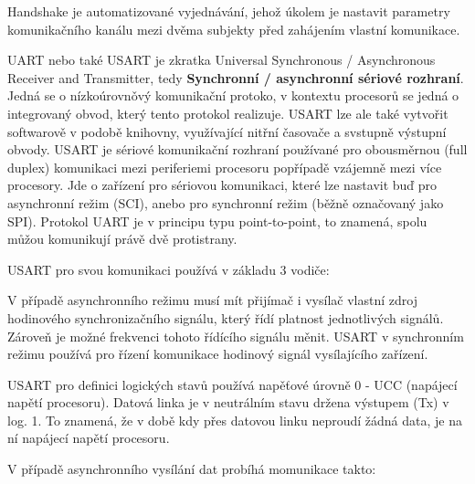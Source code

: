 

Handshake je automatizované vyjednávání, jehož úkolem je nastavit parametry komunikačního kanálu mezi dvěma subjekty před zahájením vlastní komunikace.



UART nebo také USART je zkratka Universal Synchronous / Asynchronous Receiver and Transmitter, tedy {\bf Synchronní / asynchronní sériové rozhraní}. Jedná se o nízkoúrovnǒvý komunikační protoko, v kontextu procesorů se jedná o integrovaný obvod, který tento protokol realizuje. USART lze ale také vytvořit softwarově v podobě knihovny, využívající nitřní časovače a svstupně výstupní obvody. USART je sériové komunikační rozhraní používané pro obousměrnou (full duplex) komunikaci mezi periferiemi procesoru popřípadě vzájemně mezi více procesory. Jde o zařízení pro sériovou komunikaci, které lze nastavit buď pro asynchronní režim (SCI), anebo pro synchronní režim (běžně označovaný jako SPI). Protokol UART je v principu typu point-to-point, to znamená, spolu můžou komunikují právě dvě protistrany.

USART pro svou komunikaci používá v základu 3 vodiče:

\vskip 4mm
\vskip 4mm

V případě asynchronního režimu musí mít přijímač i vysílač vlastní zdroj hodinového synchronizačního signálu, který řídí platnost jednotlivých signálů. Zároveň je možné frekvenci tohoto řídícího signálu měnit. USART v synchronním režimu používá pro řízení komunikace hodinový signál vysílajícího zařízení.


USART pro definici logických stavů používá napěťové úrovně 0 - UCC (napájecí napětí procesoru). Datová linka je v neutrálním stavu držena výstupem (Tx) v log. 1. To znamená, že v době kdy přes datovou linku neproudí žádná data, je na ní napájecí napětí procesoru.

V případě asynchronního vysílání dat probíhá momunikace takto:

\vskip 4mm
\vskip 4mm

